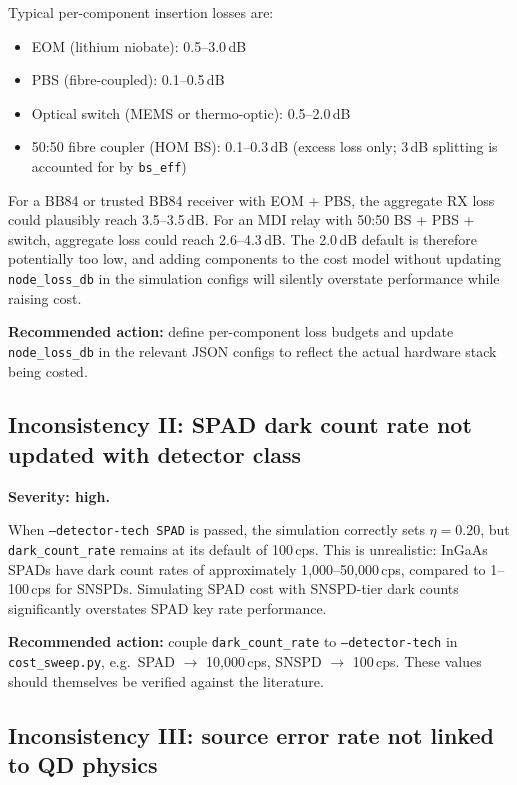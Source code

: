 \documentclass[12pt,a4paper]{article}
\begin{document}
Typical per-component insertion losses are:
\begin{itemize}
  \item EOM (lithium niobate): 0.5--3.0\,dB
  \item PBS (fibre-coupled): 0.1--0.5\,dB
  \item Optical switch (MEMS or thermo-optic): 0.5--2.0\,dB
  \item 50:50 fibre coupler (HOM BS): 0.1--0.3\,dB (excess loss only; 3\,dB splitting is accounted for by \texttt{bs\_eff})
\end{itemize}

For a BB84 or trusted BB84 receiver with EOM + PBS, the aggregate RX loss
could plausibly reach 3.5--3.5\,dB. For an MDI relay with 50:50 BS + PBS +
switch, aggregate loss could reach 2.6--4.3\,dB. The 2.0\,dB default is
therefore potentially too low, and adding components to the cost model
without updating \texttt{node\_loss\_db} in the simulation configs will
silently overstate performance while raising cost.

\textbf{Recommended action:} define per-component loss budgets and update
\texttt{node\_loss\_db} in the relevant JSON configs to reflect the actual
hardware stack being costed.

\subsection{Inconsistency II: SPAD dark count rate not updated with detector class}

\textbf{Severity: high.}

When \texttt{--detector-tech SPAD} is passed, the simulation correctly sets
$\eta = 0.20$, but \texttt{dark\_count\_rate} remains at its default of
100\,cps. This is unrealistic: InGaAs SPADs have dark count rates of
approximately 1{,}000--50{,}000\,cps, compared to 1--100\,cps for SNSPDs.
Simulating SPAD cost with SNSPD-tier dark counts significantly overstates
SPAD key rate performance.

\textbf{Recommended action:} couple \texttt{dark\_count\_rate} to
\texttt{--detector-tech} in \texttt{cost\_sweep.py}, e.g.\
SPAD $\to$ 10{,}000\,cps, SNSPD $\to$ 100\,cps. These values should
themselves be verified against the literature.

\subsection{Inconsistency III: source error rate not linked to QD physics}
\end{document}
